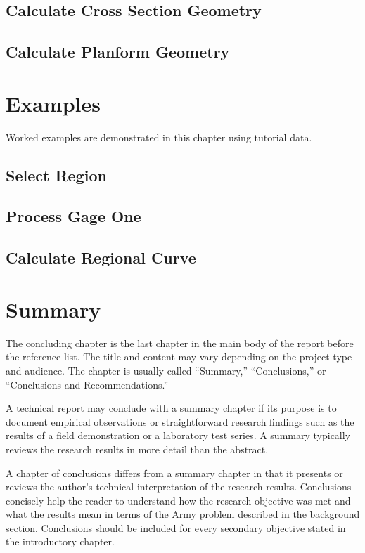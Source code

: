 \documentclass[]{book}
\theoremstyle{definition}
\theoremstyle{definition}
\theoremstyle{definition}
\theoremstyle{remark}
\begin{document}
\section{Calculate Cross Section
Geometry}\label{calculate-cross-section-geometry-1}

\section{Calculate Planform
Geometry}\label{calculate-planform-geometry-1}

\chapter{Examples}\label{examples}

Worked examples are demonstrated in this chapter using tutorial data.

\section{Select Region}\label{select-region}

\section{Process Gage One}\label{process-gage-one}

\section{Calculate Regional Curve}\label{calculate-regional-curve}

\chapter{Summary}\label{summary}

The concluding chapter is the last chapter in the main body of the
report before the reference list. The title and content may vary
depending on the project type and audience. The chapter is usually
called ``Summary,'' ``Conclusions,'' or ``Conclusions and
Recommendations.''

A technical report may conclude with a summary chapter if its purpose is
to document empirical observations or straightforward research findings
such as the results of a field demonstration or a laboratory test
series. A summary typically reviews the research results in more detail
than the abstract.

A chapter of conclusions differs from a summary chapter in that it
presents or reviews the author's technical interpretation of the
research results. Conclusions concisely help the reader to understand
how the research objective was met and what the results mean in terms of
the Army problem described in the background section. Conclusions should
be included for every secondary objective stated in the introductory
chapter.
\end{document}
